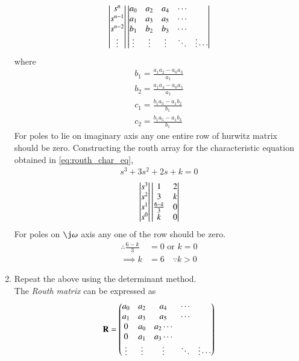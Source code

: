 \begin{enumerate}[label=\thesubsection.\arabic*.,ref=\thesubsection.\theenumi]
\begin{align}
\begin{vmatrix}s^n\\s^{n-1}\\s^{n-2} \\ \vdots\end{vmatrix}
 \begin{vmatrix}a_0 & a_2 & a_4 & \cdots \\
a_1 & a_3 & a_5 & \cdots  \\
b_1 & b_2 & b_3 & \cdots \\
\vdots & \vdots & \vdots & \ddots &\vdots 
 \cdots \\\end{vmatrix}
\end{align}
%
 where
 \begin{align}
 b_1 =\frac{ a_1a_2-a_0a_3}{a_1}  
 \\
 b_2 =\frac{ a_1a_4-a_0a_5}{a_1} 
 \\
 c_1=\frac{ b_1a_3-a_1b_2}{b_1} 
\\
 c_2=\frac{ b_1a_5-a_1b_3}{b_1}  
\end{align}
For poles to lie on imaginary axis any one entire row of hurwitz matrix should be zero.
Constructing the routh array for the characteristic equation obtained in \ref{eq:routh_char_eq},
%
\begin{align}
 s^3+3s^2+2s+k = 0
\end{align}
%
\begin{align}
\begin{vmatrix}s^3\\s^2\\s^1 \\ s^0\end{vmatrix}
\begin{vmatrix}1 & 2 \\ 3 & k \\  \frac{6-k}{3} & 0\\ k & 0\end{vmatrix}
\end{align}
For poles on $\j \omega$ axis any one of the row should be zero.
%
\begin{align}
\therefore \frac{6-k}{3} &= 0 \text{ or } k = 0
\\
\implies k &= 6 \quad \because k > 0
\end{align}
\item Repeat the above using the determinant method.
\\
\solution The {\em Routh matrix} can be expressed as
\begin{align}
\vec{R} = \myvec{a_0 & a_2 & a_4 & \cdots \\
a_1 & a_3 & a_5 & \cdots  \\
 0 & a_0 & a_2\cdots \\
 0 & a_1 & a_3 \cdots\\
\vdots & \vdots & \vdots & \ddots &\vdots 
\cdots \\}

\end{align}
\end{enumerate}

